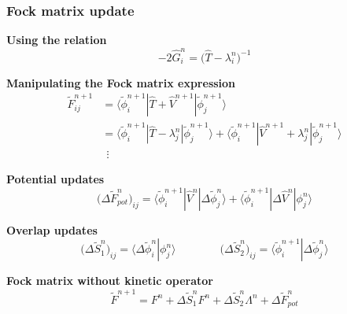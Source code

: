 \begin{frame}
    \frametitle{Fock matrix update}
    \centering
    \textbf{Using the relation}
    \begin{equation}
        \nonumber
        -2\hat{G}_i^n = \big(\hat{T} - \lambda_i^n\big)^{-1}
    \end{equation}

    \vspace{3mm}

    \textbf{Manipulating the Fock matrix expression}
    \begin{align}
        \nonumber
        \tilde{F}_{ij}^{n+1}    &= 
        \langle\tilde{\phi}_i^{n+1} |
        \hat{T} + \hat{V}^{n+1}     |
        \tilde{\phi}_j^{n+1}\rangle\\
        \nonumber
			    &= 
        \langle\tilde{\phi}_i^{n+1} |
        \hat{T} - \lambda_j^n       |
        \tilde{\phi}_j^{n+1}\rangle +
        \langle\tilde{\phi}_i^{n+1} |
        \hat{V}^{n+1} + \lambda_j^n |
        \tilde{\phi}_j^{n+1}\rangle\\
        \nonumber
        &\ \ \vdots
    \end{align}

    \textbf{Potential updates}
    \begin{equation}
        \nonumber
        \big(\Delta\tilde{F}_{pot}^n\big)_{ij} =
        \langle\tilde{\phi}_i^{n+1} |
        \hat{V}^n                       |
        \Delta\tilde{\phi}_j^n\rangle + 
        \langle\tilde{\phi}_i^{n+1} |
        \Delta\hat{V}^n                 |
        \phi_j^n\rangle
    \end{equation}

    \vspace{3mm}

    \textbf{Overlap updates}
    \begin{equation}
    \nonumber
        \big(\Delta\tilde{S}_1^n\big)_{ij} =
        \langle\Delta\tilde{\phi}_i^n | \phi_j^n\rangle \qquad \qquad
        \big(\Delta \tilde{S}_2^n\big)_{ij} =
        \langle\tilde{\phi}_i^{n+1} | \Delta\tilde{\phi}_j^n\rangle
    \end{equation}

    \vspace{3mm}

    \centering
    \textbf{Fock matrix without kinetic operator}
    \begin{equation}
        \nonumber
        \tilde{F}^{n+1} = F^{n} + 
        \Delta \tilde{S}_1^n F^n +
        \Delta \tilde{S}_2^n \Lambda^n +
        \Delta \tilde{F}_{pot}^n
    \end{equation}
\end{frame}

